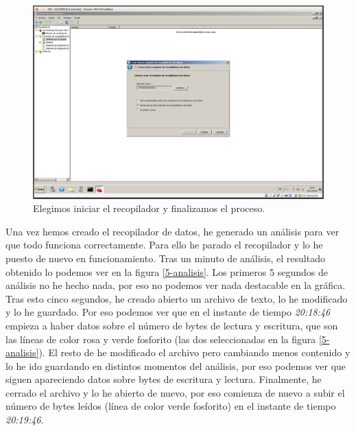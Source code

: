 \documentclass[a4paper,titlepage,12pt]{scrartcl}	%
\numberwithin{figure}{section} %
\numberwithin{table}{section} %
\begin{document}
	\begin{figure}[H]
		\centering
		\includegraphics[scale=0.27]{./Imagenes/5-9.png}
		\caption[Elegimos iniciar el recopilador y finalizamos el proceso.]{Elegimos iniciar el recopilador y finalizamos el proceso.}
		\label{5-9}
	\end{figure}

	Una vez hemos creado el recopilador de datos, he generado un análisis para ver que todo funciona correctamente. Para ello he parado el recopilador y lo he puesto de nuevo en funcionamiento. Tras un minuto de análisis, el resultado obtenido lo podemos ver en la figura \ref{5-analisis}. Los primeros 5 segundos de análisis no he hecho nada, por eso no podemos ver nada destacable en la gráfica. Tras esto cinco segundos, he creado abierto un archivo de texto, lo he modificado y lo he guardado. Por eso podemos ver que en el instante de tiempo \textit{20:18:46} empieza a haber datos sobre el número de bytes de lectura y escritura, que son las líneas de color rosa y verde fosforito (las dos seleccionadas en la figura \ref{5-analisis}). El resto de he modificado el archivo pero cambiando menos contenido y lo he ido guardando en distintos momentos del análisis, por eso podemos ver que siguen apareciendo datos sobre bytes de escritura y lectura. Finalmente, he cerrado el archivo y lo he abierto de nuevo, por eso comienza de nuevo a subir el número de bytes leídos (línea de color verde fosforito) en el instante de tiempo \textit{20:19:46}.
	
\end{document}
